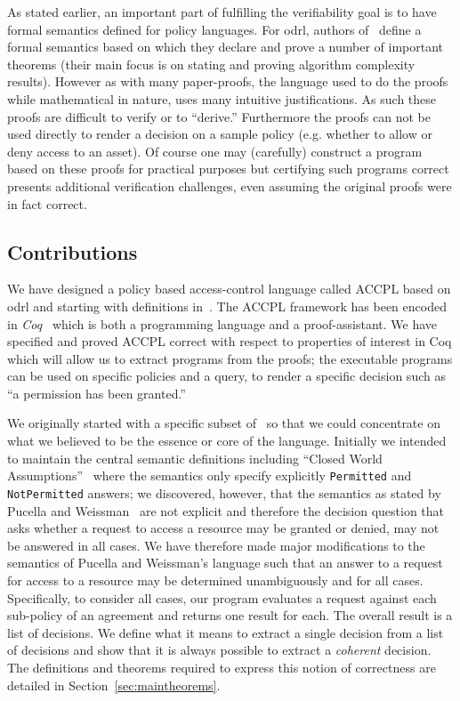 \documentclass[runningheads,a4paper]{llncs}
\newcommand{\syn}{\texttt}
\begin{document}
As stated earlier, an important part of fulfilling the verifiability goal is to have formal semantics defined for policy languages. For \ac{odrl}, authors of~\cite{pucella2006} define a formal semantics based on which they declare and prove a number of important theorems (their main focus is on stating and proving algorithm complexity results). However as with many paper-proofs, the language used to do the proofs while mathematical in nature, uses many intuitive justifications. As such these proofs are difficult to verify or to ``derive.'' Furthermore the proofs can not be used directly to render a decision on a sample policy (e.g. whether to allow or deny access to an asset). Of course one may (carefully) construct a program based on these proofs for practical purposes but certifying such programs correct presents additional verification challenges, even assuming the original proofs were in fact correct.

\subsection{Contributions}\label{sec:contribs}

We have designed a policy based access-control language called \ac{ACCPL} based on \ac{odrl} and starting with definitions in~\cite{pucella2006}. The \ac{ACCPL} framework has been encoded in \emph{Coq}~\cite{BC04} which is both a programming language and a proof-assistant. We have specified and proved \ac{ACCPL} correct with respect to properties of interest in Coq which will allow us to extract programs from the proofs; the executable programs can be used on specific policies and a query, to render a specific decision such as ``a permission has been granted.'' 

We originally started with a specific subset of~\cite{pucella2006} so that we could concentrate on what we believed to be the essence or core of the language. Initially we intended to maintain the central semantic definitions including ``Closed World Assumptions''~\cite{pucella2006} where the semantics only specify explicitly \syn{Permitted} and \syn{NotPermitted} answers; we discovered, however, that the semantics as stated by Pucella and Weissman~\cite{pucella2006} are not explicit and therefore the decision question that asks whether a request to access a resource may be granted or denied, may not be answered in all cases. We have therefore made major modifications to the semantics of Pucella and Weissman's language such that an answer to a request for access to a resource may be determined unambiguously and for all cases. 
%
Specifically, to consider all cases, our program evaluates a request
against each sub-policy of an agreement and returns one result for
each.  The overall result is a list of decisions.  We define what it
means to extract a single decision from a list of decisions and show
that it is always possible to extract a \emph{coherent} decision.  The
definitions and theorems required to express this notion of
correctness are detailed in Section~\ref{sec:maintheorems}.
\end{document}
